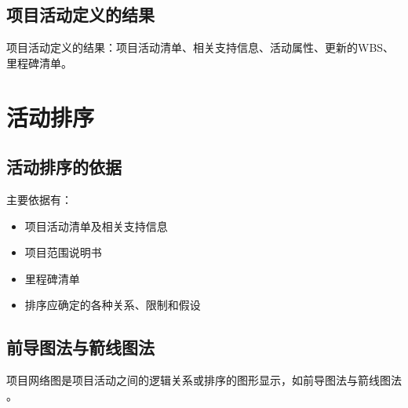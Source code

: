 \subsection{项目活动定义的结果}
项目活动定义的结果：项目活动清单、相关支持信息、活动属性、更新的WBS、里程碑清单。
\section{活动排序}
\subsection{活动排序的依据}
主要依据有：
\begin{itemize}
	\item 项目活动清单及相关支持信息
	\item 项目范围说明书
	\item 里程碑清单
	\item 排序应确定的各种关系、限制和假设
\end{itemize}
\subsection{前导图法与箭线图法}
项目网络图是项目活动之间的逻辑关系或排序的图形显示，如前导图法与箭线图法 。
